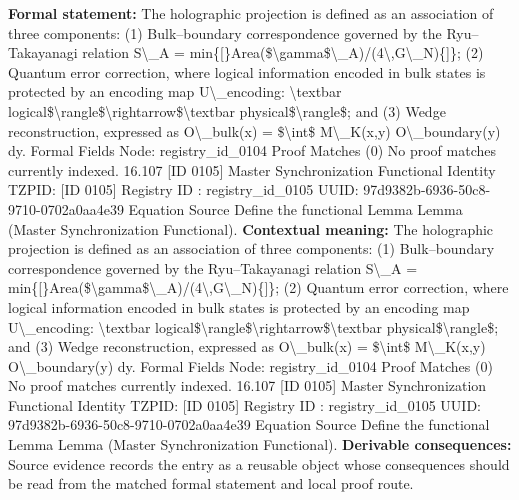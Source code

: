 \begingroup\footnotesize\setlength{\emergencystretch}{3em}\sloppy
\textbf{Formal statement:} The holographic projection is defined as an association of three components: (1) Bulk--boundary correspondence governed by the Ryu--Takayanagi relation S\textbackslash{}\_A = min\{[\}Area(\$\textbackslash{}gamma\$\textbackslash{}\_A)/(4\textbackslash{},G\textbackslash{}\_N)\{]\}; (2) Quantum error correction, where logical information encoded in bulk states is protected by an encoding map U\textbackslash{}\_encoding: \textbackslash{}textbar logical\$\textbackslash{}rangle\$\textbackslash{}rightarrow\$\textbackslash{}textbar physical\$\textbackslash{}rangle\$; and (3) Wedge reconstruction, expressed as O\textbackslash{}\_bulk(x) = \$\textbackslash{}int\$ M\textbackslash{}\_K(x,y) O\textbackslash{}\_boundary(y) dy. Formal Fields Node: registry\_id\_0104 Proof Matches (0) No proof matches currently indexed. 16.107 [ID 0105] Master Synchronization Functional Identity TZPID: [ID 0105] Registry ID : registry\_id\_0105 UUID: 97d9382b-6936-50c8-9710-0702a0aa4e39 Equation Source Define the functional Lemma Lemma (Master Synchronization Functional).
\textbf{Contextual meaning:} The holographic projection is defined as an association of three components: (1) Bulk--boundary correspondence governed by the Ryu--Takayanagi relation S\textbackslash{}\_A = min\{[\}Area(\$\textbackslash{}gamma\$\textbackslash{}\_A)/(4\textbackslash{},G\textbackslash{}\_N)\{]\}; (2) Quantum error correction, where logical information encoded in bulk states is protected by an encoding map U\textbackslash{}\_encoding: \textbackslash{}textbar logical\$\textbackslash{}rangle\$\textbackslash{}rightarrow\$\textbackslash{}textbar physical\$\textbackslash{}rangle\$; and (3) Wedge reconstruction, expressed as O\textbackslash{}\_bulk(x) = \$\textbackslash{}int\$ M\textbackslash{}\_K(x,y) O\textbackslash{}\_boundary(y) dy. Formal Fields Node: registry\_id\_0104 Proof Matches (0) No proof matches currently indexed. 16.107 [ID 0105] Master Synchronization Functional Identity TZPID: [ID 0105] Registry ID : registry\_id\_0105 UUID: 97d9382b-6936-50c8-9710-0702a0aa4e39 Equation Source Define the functional Lemma Lemma (Master Synchronization Functional).
\textbf{Derivable consequences:} Source evidence records the entry as a reusable object whose consequences should be read from the matched formal statement and local proof route.
